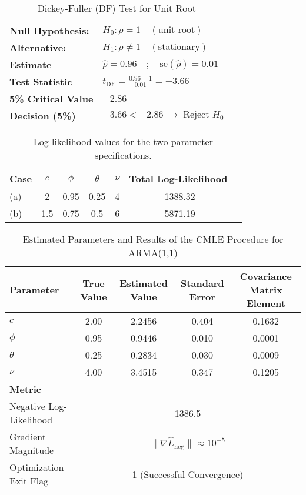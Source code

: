 \documentclass[a4paper,12pt]{article}
\begin{document}
\begin{table}[ht!]
\centering
\caption{Dickey-Fuller (DF) Test for Unit Root}
\label{tab:DF-test}

\begin{tabular}{l l}
\toprule
\textbf{Null Hypothesis:}   & $H_0: \rho = 1 \quad (\text{unit root})$ \\
\textbf{Alternative:}       & $H_1: \rho \neq 1 \quad (\text{stationary})$ \\
\midrule
\textbf{Estimate}           & $\hat{\rho} = 0.96 \quad;\quad \mathrm{se}(\hat{\rho}) = 0.01$ \\
\textbf{Test Statistic}     & $t_{\mathrm{DF}} = \frac{0.96 - 1}{0.01} = -3.66$ \\
\textbf{5\% Critical Value} & $-2.86$ \\
\textbf{Decision (5\%)}     & $-3.66 < -2.86 \;\rightarrow\; \text{Reject } H_0$ \\
\bottomrule
\end{tabular}
\end{table}



\begin{table}[h!]
\centering
\begin{tabular}{@{}lcccccc@{}}
\toprule
Case & $c$ & $\phi$ & $\theta$ & $\nu$ & Total Log-Likelihood \\ \midrule
(a)  & 2   & 0.95   & 0.25     & 4     & -1388.32             \\
(b)  & 1.5 & 0.75   & 0.5      & 6     & -5871.19             \\ \bottomrule
\end{tabular}
\caption{Log-likelihood values for the two parameter specifications.}
\label{tab:results} %
\end{table}


\begin{table}[h!]
\centering
\caption{Estimated Parameters and Results of the CMLE Procedure for ARMA(1,1)}
\label{tab:results2}
\begin{tabular}{@{}lcccc@{}}
\toprule
\textbf{Parameter} & \textbf{True Value} & \textbf{Estimated Value} & \textbf{Standard Error} & \textbf{Covariance Matrix Element} \\ \midrule
$c$      & 2.00     & 2.2456   & 0.404      & 0.1632  \\
$\phi$   & 0.95     & 0.9446   & 0.010      & 0.0001  \\
$\theta$ & 0.25     & 0.2834   & 0.030      & 0.0009  \\
$\nu$    & 4.00     & 3.4515   & 0.347      & 0.1205  \\ \midrule
\textbf{Metric} & \multicolumn{4}{c}{} \\ \midrule
Negative Log-Likelihood & \multicolumn{4}{c}{1386.5} \\
Gradient Magnitude      & \multicolumn{4}{c}{$\|\nabla \hat{L}_{\text{neg}}\| \approx 10^{-5}$} \\
Optimization Exit Flag  & \multicolumn{4}{c}{1 (Successful Convergence)} \\ \bottomrule
\end{tabular}
\end{table}
\end{document}
